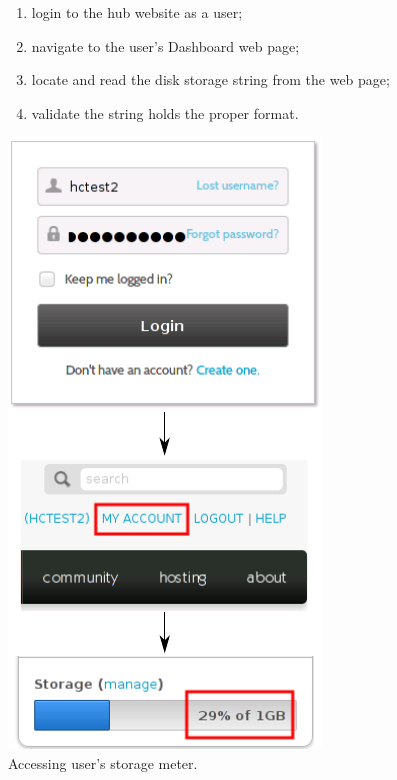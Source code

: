 \begin{figure}[H]
  \vspace{-10pt}
  \begin{minipage}[c]{0.48\linewidth}
    \begin{enumerate}
    \item login to the hub website as a user;
    \item navigate to the user's Dashboard web page;
    \item locate and read the disk storage string from the web page;
    \item validate the string holds the proper format.
    \end{enumerate}
  \end{minipage}
  \hfill
  \begin{minipage}[c]{0.48\linewidth}
    \centering
    \includegraphics[scale=0.7]
      {../../images/eps/check+user+storage+meter+process+2.pdf}
    \caption{Accessing user's storage meter.}
    \label{fig:check_user_storage_meter_process}
  \end{minipage}
\end{figure}


